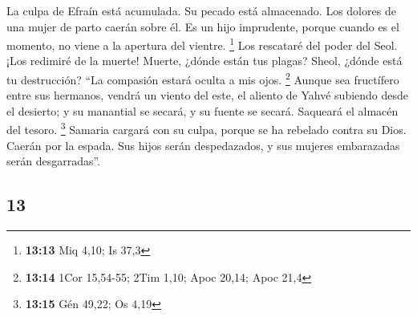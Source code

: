 \begin{paracol}{2}
 La culpa de Efraín está acumulada. Su pecado está
almacenado.  Los dolores de una mujer de parto caerán
sobre él. Es un hijo imprudente, porque cuando es el momento, no viene a
la apertura del vientre. \footnote{\textbf{13:13} Miq 4,10; Is 37,3}
 Los rescataré del poder del Seol. ¡Los redimiré de la
muerte! Muerte, ¿dónde están tus plagas? Sheol, ¿dónde está tu
destrucción? ``La compasión estará oculta a mis ojos. \footnote{\textbf{13:14}
  1Cor 15,54-55; 2Tim 1,10; Apoc 20,14; Apoc 21,4} 
Aunque sea fructífero entre sus hermanos, vendrá un viento del este, el
aliento de Yahvé subiendo desde el desierto; y su manantial se secará, y
su fuente se secará. Saqueará el almacén del tesoro. \footnote{\textbf{13:15}
  Gén 49,22; Os 4,19}  Samaria cargará con su culpa,
porque se ha rebelado contra su Dios. Caerán por la espada. Sus hijos
serán despedazados, y sus mujeres embarazadas serán desgarradas''.

\switchcolumn
\begin{otherlanguage}{english}

\hypertarget{section-25}{%
\section{13}\label{section-25}}


\end{otherlanguage}
\end{paracol}
